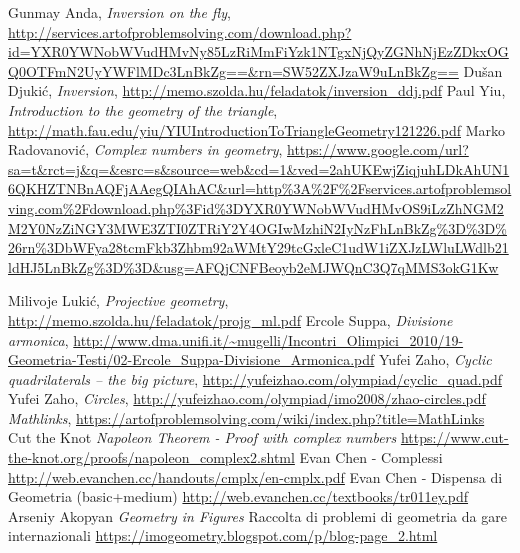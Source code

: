 \documentclass[a4paper,10pt]{article}
\begin{document}
 \begin{thebibliography}{9}
	\bibitem[1]{} Gunmay Anda, \emph{Inversion on the fly}, \url{http://services.artofproblemsolving.com/download.php?id=YXR0YWNobWVudHMvNy85LzRiMmFiYzk1NTgxNjQyZGNhNjEzZDkxOGQ0OTFmN2UyYWFlMDc3LnBkZg==&rn=SW52ZXJzaW9uLnBkZg==}
	\bibitem[2]{} Du\v{s}an Djuki\' c, \emph{Inversion}, \url{http://memo.szolda.hu/feladatok/inversion_ddj.pdf}
	\bibitem[3]{} Paul Yiu, \emph{Introduction to the geometry of the triangle}, \url{http://math.fau.edu/yiu/YIUIntroductionToTriangleGeometry121226.pdf}
	\bibitem[4]{} Marko Radovanovi\'c, \emph{Complex numbers in geometry}, 
	\url{https://www.google.com/url?sa=t&rct=j&q=&esrc=s&source=web&cd=1&ved=2ahUKEwjZiqjuhLDkAhUN16QKHZTNBnAQFjAAegQIAhAC&url=http\%3A\%2F\%2Fservices.artofproblemsolving.com\%2Fdownload.php\%3Fid\%3DYXR0YWNobWVudHMvOS9iLzZhNGM2M2Y0NzZiNGY3MWE3ZTI0ZTRiY2Y4OGIwMzhiN2IyNzFhLnBkZg\%3D\%3D\%26rn\%3DbWFya28tcmFkb3Zhbm92aWMtY29tcGxleC1udW1iZXJzLWluLWdlb21ldHJ5LnBkZg\%3D\%3D&usg=AFQjCNFBeoyb2eMJWQnC3Q7qMMS3okG1Kw}
	
	\bibitem[5]{} Milivoje Luki\'c, \emph{Projective geometry}, \url{http://memo.szolda.hu/feladatok/projg_ml.pdf}
	\bibitem[6]{} Ercole Suppa, \emph{Divisione armonica}, \url{http://www.dma.unifi.it/~mugelli/Incontri_Olimpici_2010/19-Geometria-Testi/02-Ercole_Suppa-Divisione_Armonica.pdf}
	\bibitem[7]{} Yufei Zaho, \emph{Cyclic quadrilaterals -- the big picture}, \url{http://yufeizhao.com/olympiad/cyclic_quad.pdf}
	\bibitem[8]{} Yufei Zaho, \emph{Circles}, \url{http://yufeizhao.com/olympiad/imo2008/zhao-circles.pdf}
	\bibitem[9]{} \emph{Mathlinks}, \url{https://artofproblemsolving.com/wiki/index.php?title=MathLinks}
	Cut the Knot \emph{Napoleon Theorem - Proof with complex numbers} \url{ https://www.cut-the-knot.org/proofs/napoleon_complex2.shtml}
	 Evan Chen - Complessi \url{http://web.evanchen.cc/handouts/cmplx/en-cmplx.pdf}
	 Evan Chen - Dispensa di Geometria (basic+medium) \url{http://web.evanchen.cc/textbooks/tr011ey.pdf}
	 Arseniy Akopyan \emph{Geometry in Figures}
	\bibitem[14]{} Raccolta di problemi di geometria da gare internazionali \url{https://imogeometry.blogspot.com/p/blog-page_2.html}
\end{thebibliography}
 
 
\end{document}
